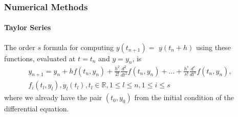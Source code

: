 \documentclass{beamer}
\newcommand{\RR}{\mathbb{R}}
\begin{document}

\begin{frame}
\frametitle{Numerical Methods}
\framesubtitle{Taylor Series}

The order $s$ formula for computing $y(t_{n+1})=$ $y(t_{n}+h)$ using these functions, evaluated at $t=t_{n}$ and $y=y_{n}$, is
\begin{eqnarray}
y_{n+1} = y_{n} + h f(t_{n}, y_{n}) + \frac{h^2}{2!} \frac{d^2}{dt^2} f(t_{n}, y_{n}) + ... + \frac{h^s}{s!} \frac{d^s}{dt^s} f(t_{n}, y_{n}), &\nonumber\\ 
f_i(t_l, y_l), y_l(t_l), t_l \in \RR, 1 \leq l \leq n, 1 \leq i \leq s
\end{eqnarray}
where we already have the pair $(t_0, y_0)$ from the initial condition of the differential equation.

\end{frame}

\end{document}
